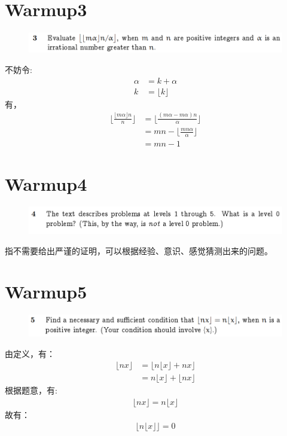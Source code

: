 \documentclass[]{article}
\begin{document}
\section*{Warmup3}
\begin{figure}[H]
\includegraphics[scale = 1]{Q3.png}
\end{figure}
不妨令:
\begin{align}
    \alpha &= k + {\alpha} \\
    k &= \lfloor k \rfloor
\end{align}
有，
\begin{align}
    \lfloor \frac{\lfloor m\alpha \rfloor n}{n} \rfloor&=\lfloor \frac{(m\alpha - m{\alpha})n}{\alpha} \rfloor \\
    &=mn - \lfloor \frac{mn{\alpha}}{\alpha} \rfloor \\
    &= mn - 1
\end{align}

\section*{Warmup4}
\begin{figure}[H]
\includegraphics[scale = 1]{Q4.png}
\end{figure}
指不需要给出严谨的证明，可以根据经验、意识、感觉猜测出来的问题。\par 

\section*{Warmup5}
\begin{figure}[H]
\includegraphics[scale = 1]{Q5.png}
\end{figure}
由定义，有：
\begin{align}
    \lfloor nx \rfloor &= \lfloor n\lfloor x\rfloor + n{x} \rfloor \\
                        &= n\lfloor x \rfloor + \lfloor n{x}\rfloor
\end{align}
根据题意，有:
\begin{align}
    \lfloor nx \rfloor = n\lfloor x \rfloor
\end{align}
故有：
\begin{align}
    \lfloor n\lfloor x\rfloor \rfloor = 0    
\end{align}
\end{document}
